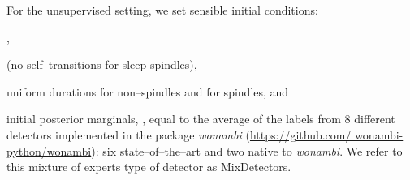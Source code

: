 \documentclass[runningheads]{llncs}
\begin{document}
For  the unsupervised setting, we set sensible initial conditions: \begin{enumerate*}[label=\roman*)]
	\item \pi, 
	\item  (no self--transitions for sleep spindles),
	\item uniform durations for non--spindles and  for spindles, and
	\item initial posterior marginals, , equal to the average of the labels from 8 different detectors implemented in the package \textit{wonambi} (\url{https://github.com/ wonambi-python/wonambi}): six state--of--the--art \cite{ferrarelli2007reduced,molle2011fast,nir2011regional,leclercq2011fmri,wamsley2012reduced,martin2013topography} and two native to \textit{wonambi}. We refer to this mixture of experts type of detector as MixDetectors.
\end{enumerate*}
\end{document}
